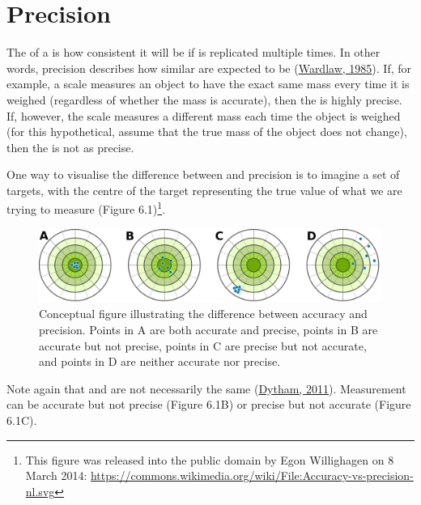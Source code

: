 \documentclass[
  openany]{krantz}
\begin{document}
\hypertarget{precision}{%
\section{Precision}\label{precision}}

The \textbf{} of a  is how consistent it will be if  is replicated multiple times.
In other words, precision describes how similar  are expected to be (\protect\hyperlink{ref-Wardlaw1985}{Wardlaw, 1985}).
If, for example, a scale measures an object to have the exact same mass every time it is weighed (regardless of whether the mass is accurate), then the  is highly precise.
If, however, the scale measures a different mass each time the object is weighed (for this hypothetical, assume that the true mass of the object does not change), then the  is not as precise.

One way to visualise the difference between  and precision is to imagine a set of targets, with the centre of the target representing the true value of what we are trying to measure (Figure 6.1)\footnote{This figure was released into the public domain by Egon Willighagen on 8 March 2014: \url{https://commons.wikimedia.org/wiki/File:Accuracy-vs-precision-nl.svg}}.

\begin{figure}
\includegraphics[width=1\linewidth]{img/accuracy_vs_precision} \caption{Conceptual figure illustrating the difference between accuracy and precision. Points in A are both accurate and precise, points in B are accurate but not precise, points in C are precise but not accurate, and points in D are neither accurate nor precise.}\label{fig:unnamed-chunk-23}
\end{figure}

Note again that  and  are not necessarily the same (\protect\hyperlink{ref-Dytham2011}{Dytham, 2011}).
Measurement can be accurate but not precise (Figure 6.1B) or precise but not accurate (Figure 6.1C).
\end{document}
